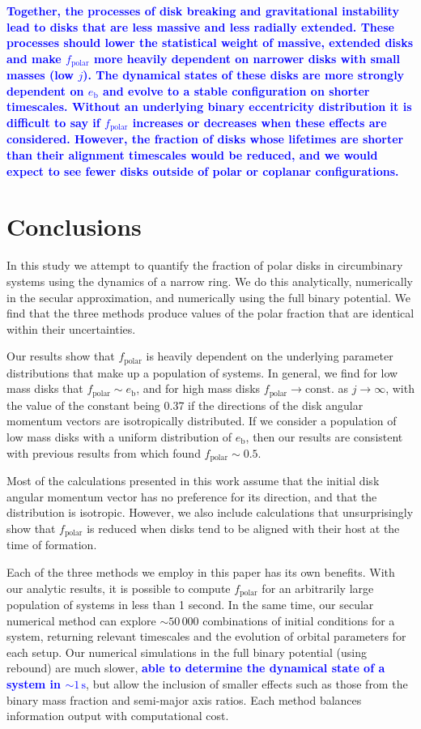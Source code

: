 \documentclass[twocolumn,linenumbers]{aastex631}
\newcommand{\RR}[1]{\textcolor{blue}{\bf#1}} %
\begin{document}
\RR{
    Together, the processes of disk breaking and gravitational instability lead to disks that are less massive and less radially extended. These processes should lower the statistical weight of massive, extended disks and make $f_\text{polar}$ more heavily dependent on narrower disks with small masses (low $j$). The dynamical states of these disks are more strongly dependent on $e_\text{b}$ and evolve to a stable configuration on shorter timescales. Without an underlying binary eccentricity distribution it is difficult to say if $f_\text{polar}$ increases or decreases when these effects are considered. However, the fraction of disks whose lifetimes are shorter than their alignment timescales would be reduced, and we would expect to see fewer disks outside of polar or coplanar configurations. 
}

\section{Conclusions}
\label{sec:conclusions}

In this study we attempt to quantify the fraction of polar disks in circumbinary systems using the dynamics of a narrow ring. We do this analytically, numerically in the secular approximation, and numerically using the full binary potential. We find that the three methods produce values of the polar fraction that are identical within their uncertainties.

Our results show that $f_\text{polar}$ is heavily dependent on the underlying parameter distributions that make up a population of systems. In general, we find for low mass disks that $f_\text{polar} \sim e_\text{b}$, and for high mass disks $f_\text{polar} \rightarrow \text{const.}$ as $j\rightarrow \infty$, with the value of the constant being 0.37 if the directions of the disk angular momentum vectors are isotropically distributed.
If we consider a population of low mass disks with a uniform distribution of $e_\text{b}$, then our results are consistent with previous results from \citet{ceppi2024} which found $f_\text{polar}\sim 0.5$. 

Most of the calculations presented in this work assume that the initial disk angular momentum vector has no preference for its direction, and that the distribution is isotropic. However, we also include calculations that unsurprisingly show that $f_\text{polar}$ is reduced when disks tend to be aligned with their host at the time of formation.

Each of the three methods we employ in this paper has its own benefits. With our analytic results, it is possible to compute $f_\text{polar}$ for an arbitrarily large population of systems in less than 1 second. In the same time, our secular numerical method can explore $\sim 50\,000$ combinations of initial conditions for a system, returning relevant timescales and the evolution of orbital parameters for each setup. Our numerical simulations in the full binary potential (using {\sc rebound}) are much slower, \RR{able to determine the dynamical state of a system in $\sim 1\,\text{s}$}, but allow the inclusion of smaller effects such as those from the binary mass fraction and semi-major axis ratios. Each method balances information output with computational cost.
\end{document}

